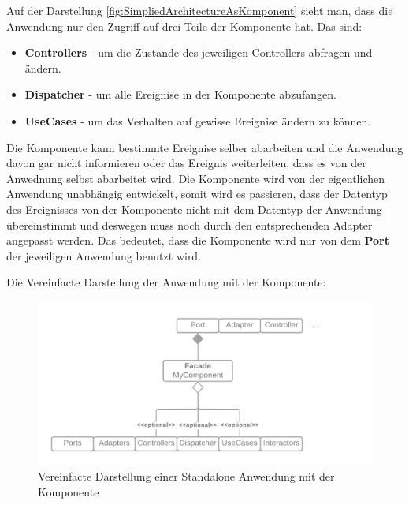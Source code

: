 \documentclass{article}
\begin{document}
    Auf der Darstellung \ref{fig:SimpliedArchitectureAsKomponent} sieht man, dass die Anwendung nur den Zugriff auf drei Teile der Komponente hat.
    Das sind:
    \begin{itemize}
        \item \textbf{Controllers} - um die Zustände des jeweiligen Controllers abfragen und ändern.
        \item \textbf{Dispatcher} - um alle Ereignise in der Komponente abzufangen.
        \item \textbf{UseCases} - um das Verhalten auf gewisse Ereignise ändern zu können.
    \end{itemize}

    Die Komponente kann bestimmte Ereignise selber abarbeiten und die Anwendung davon gar nicht informieren oder
    das Ereignis weiterleiten, dass es von der Anwednung selbst abarbeitet wird.
    Die Komponente wird von der eigentlichen Anwendung unabhängig entwickelt, somit wird es passieren, dass
    der Datentyp des Ereignisses von der Komponente nicht mit dem Datentyp der Anwendung übereinstimmt und deswegen muss noch durch den entsprechenden Adapter angepasst werden.
    Das bedeutet, dass die Komponente wird nur von dem \textbf{Port} der jeweiligen Anwendung benutzt wird.

    \newpage
    Die Vereinfacte Darstellung der Anwendung mit der Komponente:
    \begin{figure}[H]
        \centering
        \includegraphics[width=1\textwidth]{./images/Architecture as Component.png}
        \caption{Vereinfacte Darstellung einer Standalone Anwendung mit der Komponente}
        \label{fig:SimpliedArchitectureAsStandaloneWithComponent}
    \end{figure}
\end{document}
